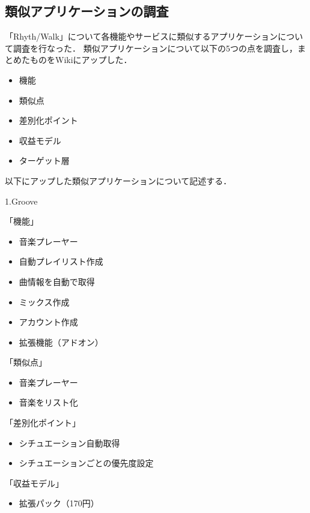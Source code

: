 \subsection{類似アプリケーションの調査}

\par 
 「Rhyth/Walk」について各機能やサービスに類似するアプリケーションについて調査を行なった．
類似アプリケーションについて以下の5つの点を調査し，まとめたものをWikiにアップした．
\begin{itemize}
\item 機能
\item 類似点
\item 差別化ポイント
\item 収益モデル
\item ターゲット層
\end{itemize}
\par
以下にアップした類似アプリケーションについて記述する．
\par
1.Groove
\par
「機能」
\begin{itemize}
\item 音楽プレーヤー
\item 自動プレイリスト作成
\item 曲情報を自動で取得
\item ミックス作成
\item アカウント作成
\item 拡張機能（アドオン）
\end{itemize}

「類似点」
\begin{itemize}
\item 音楽プレーヤー
\item 音楽をリスト化
\end{itemize}

「差別化ポイント」
\begin{itemize}
\item シチュエーション自動取得
\item シチュエーションごとの優先度設定
\end{itemize}

「収益モデル」
\begin{itemize}
\item 拡張パック（170円）
\end{itemize}

